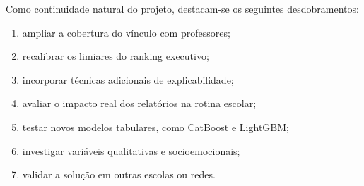 Como continuidade natural do projeto, destacam-se os seguintes desdobramentos:

\begin{enumerate}
    \item ampliar a cobertura do v\'inculo com professores;
    \item recalibrar os limiares do ranking executivo;
    \item incorporar t\'ecnicas adicionais de explicabilidade;
    \item avaliar o impacto real dos relat\'orios na rotina escolar;
    \item testar novos modelos tabulares, como CatBoost e LightGBM;
    \item investigar vari\'aveis qualitativas e socioemocionais;
    \item validar a solu\c{c}\~ao em outras escolas ou redes.
\end{enumerate}
